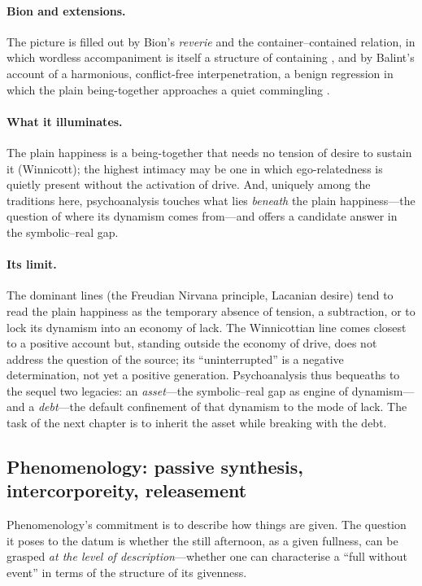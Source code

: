 \paragraph{Bion and extensions.} The picture is filled out by Bion's \emph{reverie} and the container--contained relation, in which wordless accompaniment is itself a structure of containing \parencite{bion1962}, and by Balint's account of a harmonious, conflict-free interpenetration, a benign regression in which the plain being-together approaches a quiet commingling \parencite{balint1968}.

\paragraph{What it illuminates.} The plain happiness is a being-together that needs no tension of desire to sustain it (Winnicott); the highest intimacy may be one in which ego-relatedness is quietly present without the activation of drive. And, uniquely among the traditions here, psychoanalysis touches what lies \emph{beneath} the plain happiness---the question of where its dynamism comes from---and offers a candidate answer in the symbolic--real gap.

\paragraph{Its limit.} The dominant lines (the Freudian Nirvana principle, Lacanian desire) tend to read the plain happiness as the temporary absence of tension, a subtraction, or to lock its dynamism into an economy of lack. The Winnicottian line comes closest to a positive account but, standing outside the economy of drive, does not address the question of the source; its ``uninterrupted'' is a negative determination, not yet a positive generation. Psychoanalysis thus bequeaths to the sequel two legacies: an \emph{asset}---the symbolic--real gap as engine of dynamism---and a \emph{debt}---the default confinement of that dynamism to the mode of lack. The task of the next chapter is to inherit the asset while breaking with the debt.

\subsection{Phenomenology: passive synthesis, intercorporeity, releasement}
\label{p19:sub:theories-phenom}

Phenomenology's commitment is to describe how things are given. The question it poses to the datum is whether the still afternoon, as a given fullness, can be grasped \emph{at the level of description}---whether one can characterise a ``full without event'' in terms of the structure of its givenness.

